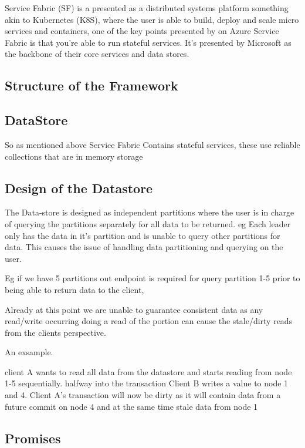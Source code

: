 \documentclass[a4paper,10pt,titlepage]{report}
\begin{document}
Service Fabric (SF) is a presented as a distributed systems platform something akin to Kubernetes (K8S), where the user is able to build, deploy and scale micro services and containers, one of the key points presented by on Azure Service Fabric is that you're able to run stateful services. It's presented by Microsoft as the backbone of their core services and data stores.


\subsection{Structure of the Framework}


\subsection{DataStore}

So as mentioned above Service Fabric Contains stateful services, these use reliable collections that are in memory storage

\subsection{Design of the Datastore}

The Data-store is designed as independent partitions where the user is in charge of querying the partitions separately for all data to be returned. eg Each leader only has the data in it's partition and is unable to query other partitions for data. This causes the issue of handling data partitioning and querying on the user.

Eg if we have 5 partitions out endpoint is required for query partition 1-5 prior to being able to return data to the client,

Already at this point we are unable to guarantee consistent data as any read/write occurring doing a read of the portion can cause the stale/dirty reads from the clients perspective.

An exsample.

client A wants to read all data from the datastore and starts reading from node 1-5 sequentially. halfway into the transaction Client B writes a value to node 1 and 4. Client A's transaction will now be dirty as it will contain data from a future commit on node 4 and at the same time stale data from node 1



\subsection{Promises}
\end{document}
